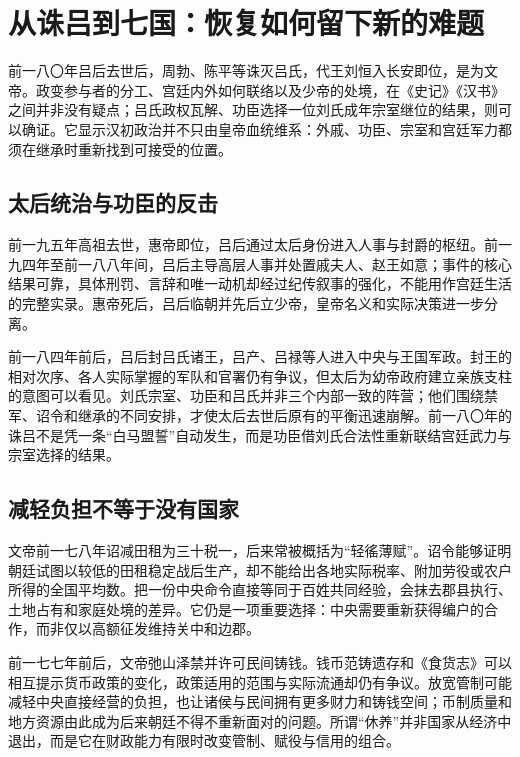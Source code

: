 \section{从诛吕到七国：恢复如何留下新的难题}
\label{sec:western-han-recovery-law-princes}

前一八〇年吕后去世后，周勃、陈平等诛灭吕氏，代王刘恒入长安即位，是为文帝。政变参与者的分工、宫廷内外如何联络以及少帝的处境，在《史记》《汉书》之间并非没有疑点；吕氏政权瓦解、功臣选择一位刘氏成年宗室继位的结果，则可以确证。它显示汉初政治并不只由皇帝血统维系：外戚、功臣、宗室和宫廷军力都须在继承时重新找到可接受的位置。

\subsection{太后统治与功臣的反击}

前一九五年高祖去世，惠帝即位，吕后通过太后身份进入人事与封爵的枢纽。前一九四年至前一八八年间，吕后主导高层人事并处置戚夫人、赵王如意；事件的核心结果可靠，具体刑罚、言辞和唯一动机却经过纪传叙事的强化，不能用作宫廷生活的完整实录。惠帝死后，吕后临朝并先后立少帝，皇帝名义和实际决策进一步分离。

前一八四年前后，吕后封吕氏诸王，吕产、吕禄等人进入中央与王国军政。封王的相对次序、各人实际掌握的军队和官署仍有争议，但太后为幼帝政府建立亲族支柱的意图可以看见。刘氏宗室、功臣和吕氏并非三个内部一致的阵营；他们围绕禁军、诏令和继承的不同安排，才使太后去世后原有的平衡迅速崩解。前一八〇年的诛吕不是凭一条“白马盟誓”自动发生，而是功臣借刘氏合法性重新联结宫廷武力与宗室选择的结果。

\subsection{减轻负担不等于没有国家}

文帝前一七八年诏减田租为三十税一，后来常被概括为“轻徭薄赋”。诏令能够证明朝廷试图以较低的田租稳定战后生产，却不能给出各地实际税率、附加劳役或农户所得的全国平均数。把一份中央命令直接等同于百姓共同经验，会抹去郡县执行、土地占有和家庭处境的差异。它仍是一项重要选择：中央需要重新获得编户的合作，而非仅以高额征发维持关中和边郡。

前一七七年前后，文帝弛山泽禁并许可民间铸钱。钱币范铸遗存和《食货志》可以相互提示货币政策的变化，政策适用的范围与实际流通却仍有争议。放宽管制可能减轻中央直接经营的负担，也让诸侯与民间拥有更多财力和铸钱空间；币制质量和地方资源由此成为后来朝廷不得不重新面对的问题。所谓“休养”并非国家从经济中退出，而是它在财政能力有限时改变管制、赋役与信用的组合。

